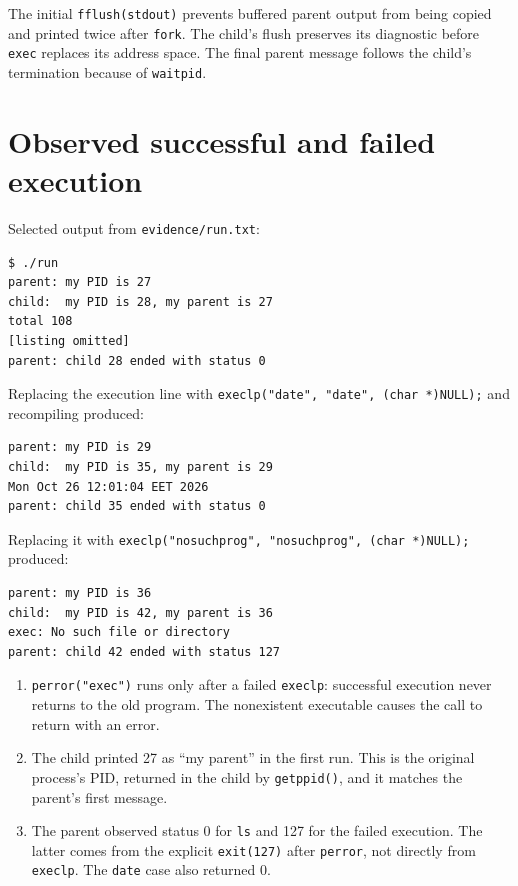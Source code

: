 \documentclass{../latex/utmreport}
\providecommand{\tightlist}{\setlength{\itemsep}{0pt}\setlength{\parskip}{0pt}}
\begin{document}
The initial \texttt{fflush(stdout)} prevents buffered parent output from
being copied and printed twice after \texttt{fork}. The child's flush
preserves its diagnostic before \texttt{exec} replaces its address
space. The final parent message follows the child's termination because
of \texttt{waitpid}.

\section{Observed successful and failed
execution}\label{observed-successful-and-failed-execution}

Selected output from \texttt{evidence/run.txt}:

\begin{lstlisting}
$ ./run
parent: my PID is 27
child:  my PID is 28, my parent is 27
total 108
[listing omitted]
parent: child 28 ended with status 0
\end{lstlisting}

Replacing the execution line with
\texttt{execlp("date",\ "date",\ (char\ *)NULL);} and recompiling
produced:

\begin{lstlisting}
parent: my PID is 29
child:  my PID is 35, my parent is 29
Mon Oct 26 12:01:04 EET 2026
parent: child 35 ended with status 0
\end{lstlisting}

Replacing it with
\texttt{execlp("nosuchprog",\ "nosuchprog",\ (char\ *)NULL);} produced:

\begin{lstlisting}
parent: my PID is 36
child:  my PID is 42, my parent is 36
exec: No such file or directory
parent: child 42 ended with status 127
\end{lstlisting}

\begin{enumerate}
\def\labelenumi{\arabic{enumi}.}
\tightlist
\item
  \texttt{perror("exec")} runs only after a failed \texttt{execlp}:
  successful execution never returns to the old program. The nonexistent
  executable causes the call to return with an error.
\item
  The child printed 27 as ``my parent'' in the first run. This is the
  original process's PID, returned in the child by \texttt{getppid()},
  and it matches the parent's first message.
\item
  The parent observed status 0 for \texttt{ls} and 127 for the failed
  execution. The latter comes from the explicit \texttt{exit(127)} after
  \texttt{perror}, not directly from \texttt{execlp}. The \texttt{date}
  case also returned 0.
\end{enumerate}
\end{document}
